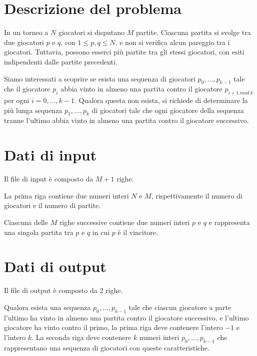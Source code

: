 \documentclass[a4paper,11pt]{article}
\begin{document}


\vspace{0.5cm}

\section*{Descrizione del problema}
  
      In un torneo a $N$ giocatori si disputano $M$ partite.
      Ciascuna partita si svolge tra due giocatori $p$ e $q$,
      con $1 ≤ p,q ≤ N $, e non si verifica alcun pareggio tra i
      giocatori. Tuttavia, possono esserci più partite tra gli stessi giocatori,
      con esiti indipendenti dalle partite precedenti.
    
      Siamo interessati a scoprire se esista una sequenza di giocatori $p_{0}, \ldots, p_{k-1}$ tale che il giocatore $p_i$ abbia vinto in almeno una partita contro il giocatore $p_{i+1 .mod. k}$ per ogni $i=0,\ldots, k-1$.
      Qualora questa non esista,
      si richiede di determinare la pi\`u lunga sequenza $p_{1}, \ldots, p_{\overline{k}}$
      di giocatori tale che ogni giocatore della sequenza
      tranne l'ultimo abbia vinto in almeno una partita contro il giocatore
      successivo. 
    

\section*{Dati di input}
  
      Il file di input è composto da $M+1$ righe.
    
      La prima riga contiene due numeri interi $N$ e $M$,
      rispettivamente il numero di giocatori e il numero di partite.
    
      Ciascuna delle $M$ righe successive contiene due numeri interi
      $p$ e $q$ e rappresenta una singola partita tra 
      $p$ e $q$ in cui $p$ è il vincitore.
    

\section*{Dati di output}
  
      Il file di output è composto da 2 righe.
    
      Qualora esista una sequenza $p_{0}, \ldots, p_{k-1}$ tale che 
      ciascun giocatore a parte l'ultimo ha vinto in almeno una partita contro il giocatore successivo, e l'ultimo giocatore ha vinto contro il primo, la prima riga deve contenere l'intero $-1$ e l'intero $k$.
      La seconda riga deve contenere $k$ numeri interi $p_{0}, \ldots, p_{k-1}$
      che rappresentano una sequenza di giocatori con queste caratteristiche.
    
\end{document}
